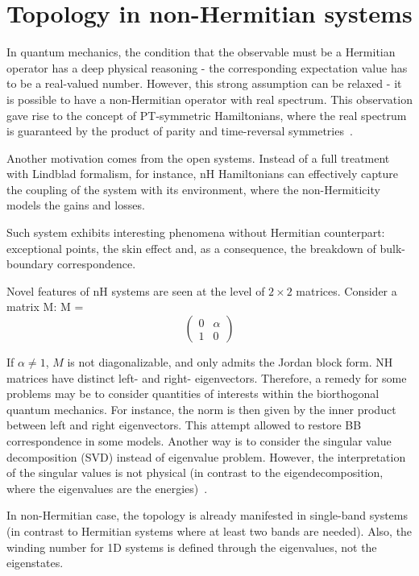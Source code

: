\chapter{Topology in non-Hermitian systems}
\label{ch:nh}
In quantum mechanics, the condition that the observable must be a Hermitian operator has a deep physical reasoning - the corresponding expectation value has to be a real-valued number. However, this strong assumption can be relaxed - it is possible to have a non-Hermitian operator with real spectrum. This observation gave rise to the concept of PT-symmetric Hamiltonians, where the real spectrum is guaranteed by the product of parity and time-reversal symmetries~\cite{BenderPT1998}.

Another motivation comes from the open systems. Instead of a full treatment with Lindblad formalism, for instance, nH Hamiltonians can effectively capture the coupling of the system with its environment, where the non-Hermiticity models the gains and losses.

Such system exhibits interesting phenomena without Hermitian counterpart: exceptional points, the skin effect and, as a consequence, the breakdown of bulk-boundary correspondence.

Novel features of nH systems are seen at the level of $2 \times 2$ matrices. Consider a matrix M:
M = \begin{equation}
\begin{pmatrix}
0 & \alpha \\
1 & 0 
\end{pmatrix}
\end{equation}


If $\alpha \neq 1$, $M$ is not diagonalizable, and only admits the Jordan block form. NH matrices have distinct left- and right- eigenvectors. Therefore, a remedy for some problems may be to consider quantities of interests within the biorthogonal quantum mechanics. For instance, the norm is then given by the inner product between left and right eigenvectors. This attempt allowed to restore BB correspondence in some models. Another way is to consider the singular value decomposition (SVD) instead of eigenvalue problem. However, the interpretation of the singular values is not physical (in contrast to the eigendecomposition, where the eigenvalues are the energies)~\cite{SVDHerviou2019}.




In non-Hermitian case, the topology is already manifested in single-band systems (in contrast to Hermitian systems where at least two bands are needed). Also, the winding number for 1D systems is defined through the eigenvalues, not the eigenstates.


